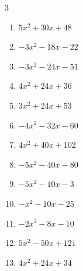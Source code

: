 \begin{multicols}{3}
\begin{enumerate}

  \item $5x^{2}+30x+48$


  \item $-3x^{2}-18x-22$


  \item $-3x^{2}-24x-51$


  \item $4x^{2}+24x+36$


\columnbreak %

  \item $3x^{2}+24x+53$


  \item $-4x^{2}-32x-60$


  \item $4x^{2}+40x+102$


  \item $-5x^{2}-40x-80$


  \item $-5x^{2}-10x-3$


  \item $-x^{2}-10x-25$


  \item $-2x^{2}-8x-10$


  \item $5x^{2}-50x+121$


  \item $4x^{2}+24x+34$



\end{enumerate}
\end{multicols}
